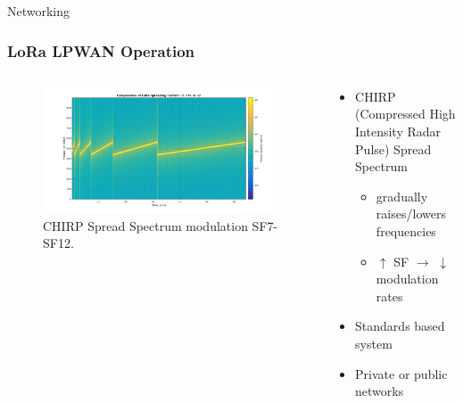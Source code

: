 \documentclass{beamer}
\begin{document}
  \begin{frame}{Networking}
    \frametitle{LoRa LPWAN Operation}
    \begin{columns}
      \begin{column}{0.5\textwidth}
        \begin{figure}[htbp]
          \centering
          \includegraphics[width=\textwidth]{Chirp.png}
          \caption{CHIRP Spread Spectrum modulation SF7-SF12.\cite{ghoslya2017lora}}
          \label{fig:CHIRP_Spread_Spectrum}
        \end{figure}
      \end{column}
      \begin{column}{0.5\textwidth}
        \begin{itemize}
          \item CHIRP (Compressed High Intensity Radar Pulse) Spread Spectrum
          \begin{itemize}
            \item gradually raises/lowers frequencies
            \item $\uparrow$ SF $\rightarrow$ $\downarrow$ modulation rates
          \end{itemize}
          \item Standards based system
          \item Private or public networks
        \end{itemize}
      \end{column}
    \end{columns}
  \end{frame}
\end{document}
